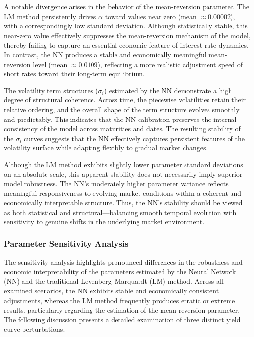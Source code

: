 A notable divergence arises in the behavior of the mean-reversion parameter. The LM method persistently drives \(\alpha\) toward values near zero (mean \(\approx 0.00002\)), with a correspondingly low standard deviation. Although statistically stable, this near-zero value effectively suppresses the mean-reversion mechanism of the model, thereby failing to capture an essential economic feature of interest rate dynamics. In contrast, the NN produces a stable and economically meaningful mean-reversion level (mean \(\approx 0.0109\)), reflecting a more realistic adjustment speed of short rates toward their long-term equilibrium.

The volatility term structures (\(\sigma_i\)) estimated by the NN demonstrate a high degree of structural coherence. Across time, the piecewise volatilities retain their relative ordering, and the overall shape of the term structure evolves smoothly and predictably. This indicates that the NN calibration preserves the internal consistency of the model across maturities and dates. The resulting stability of the \(\sigma_i\) curves suggests that the NN effectively captures persistent features of the volatility surface while adapting flexibly to gradual market changes.

Although the LM method exhibits slightly lower parameter standard deviations on an absolute scale, this apparent stability does not necessarily imply superior model robustness. The NN’s moderately higher parameter variance reflects meaningful responsiveness to evolving market conditions within a coherent and economically interpretable structure. Thus, the NN’s stability should be viewed as both statistical and structural—balancing smooth temporal evolution with sensitivity to genuine shifts in the underlying market environment.

\subsubsection{Parameter Sensitivity Analysis}
The sensitivity analysis highlights pronounced differences in the robustness and economic interpretability of the parameters estimated by the Neural Network (NN) and the traditional Levenberg–Marquardt (LM) method. Across all examined scenarios, the NN exhibits stable and economically consistent adjustments, whereas the LM method frequently produces erratic or extreme results, particularly regarding the estimation of the mean-reversion parameter. The following discussion presents a detailed examination of three distinct yield curve perturbations.

